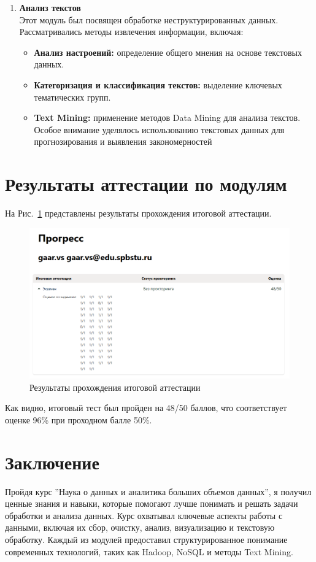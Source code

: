 \documentclass[a4paper, final]{article}
\begin{document}
\begin{enumerate}
  \item \textbf{Анализ текстов}\\
Этот модуль был посвящен обработке неструктурированных данных. Рассматривались методы извлечения информации, включая:
    \begin{itemize}
      \item \textbf{Анализ настроений:} определение общего мнения на основе текстовых данных.
      \item \textbf{Категоризация и классификация текстов:} выделение ключевых тематических групп.
      \item \textbf{Text Mining:} применение методов Data Mining для анализа текстов. Особое внимание уделялось использованию текстовых данных для прогнозирования и выявления закономерностей
    \end{itemize}
\end{enumerate}
 

\newpage
\section{Результаты аттестации по модулям}
На Рис.~\ref{img:exam} представлены результаты прохождения итоговой аттестации.

\begin{figure}[H]
   \centering
   \includegraphics[width=1\linewidth]{exam.png}
   \caption{Результаты прохождения итоговой аттестации}
   \label{img:exam}
\end{figure}

Как видно, итоговый тест был пройден на 48/50 баллов, что соответствует оценке 96\% при проходном балле 50\%.

\cleardoublepage
{}
\newpage
{}
\section*{Заключение}
Пройдя курс ''Наука о данных и аналитика больших объемов данных'', я получил ценные знания и навыки, которые помогают лучше понимать и решать задачи обработки и анализа данных. Курс охватывал ключевые аспекты работы с данными, включая их сбор, очистку, анализ, визуализацию и текстовую обработку. Каждый из модулей предоставил структурированное понимание современных технологий, таких как Hadoop, NoSQL и методы Text Mining.
\end{document}
